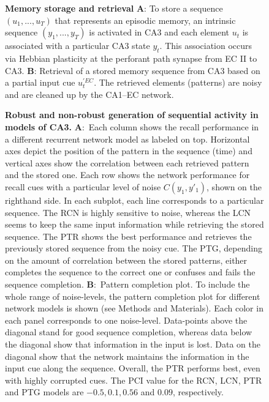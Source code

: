 \documentclass[utf8]{frontiersSCNS} %
\begin{document}
\begin{figure}[!htb]
\caption{\textbf{Memory storage and retrieval} \textbf A: To store a sequence $(u_1 , . . . ,u_T)$ that represents an episodic memory, an intrinsic sequence $(y_1 , . . . ,y_T)$ is activated in CA3 and each element $u_t$ is associated with a particular CA3 state $y_t$. This association occurs via Hebbian plasticity at the perforant path synapse from EC II to CA3. \textbf B: Retrieval of a stored memory sequence from CA3 based on a partial input cue $u^{'EC}_t$. The retrieved elements (patterns) are noisy and are cleaned up by the CA1–EC network.}
\label{Fig_2}
\end{figure}

\begin{figure}[!htb]
\caption{\textbf{Robust and non-robust generation of sequential activity in models of CA3.} \textbf{A}:~Each column shows the recall performance in a different recurrent network model as labeled on top. Horizontal axes depict the position of the pattern in the sequence (time) and vertical axes show the correlation between each retrieved pattern and the stored one. Each row shows the network performance for recall cues with a particular level of noise $C(y_{1}, y'_{1})$, shown on the righthand side. In each subplot, each line corresponds to a particular sequence. The RCN is highly sensitive to noise, whereas the LCN seems to keep the same input information while retrieving the stored sequence. The PTR shows the best performance and retrieves the previously stored sequence from the noisy cue. The PTG, depending on the amount of correlation between the stored patterns, either completes the sequence to the correct one or confuses and fails the sequence completion. \textbf{B}:~Pattern completion plot. To include the whole range of noise-levels, the pattern completion plot for different network models is shown (see Methods and Materials). Each color in each panel corresponds to one noise-level. Data-points above the diagonal stand for good sequence completion, whereas data below the diagonal show that information in the input is lost. Data on the diagonal show that the network maintains the information in the input cue along the sequence. Overall, the PTR performs best, even with highly corrupted cues. The PCI value for the RCN, LCN, PTR and PTG models are $-0.5, 0.1, 0.56$ and $0.09$, respectively.} 
\label{Fig_3}
\end{figure}
\end{document}
